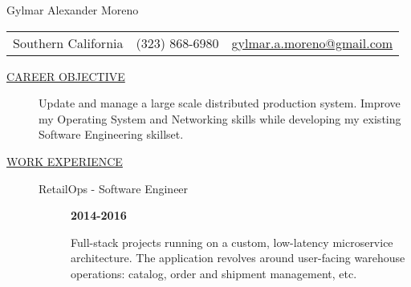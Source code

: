 \documentclass[12pt]{article}
\begin{document}
    \begin{center}
        {\LARGE Gylmar Alexander Moreno}
        \\
        \begin{tabular}{l|l|l}
            Southern California & (323) 868-6980 &
            \href{mailto:gylmar.a.moreno@gmail.com}{gylmar.a.moreno@gmail.com}
        \end{tabular}
    \end{center}

\begin{description}
    \item[\underline{CAREER OBJECTIVE}] \hfill
        \begin{flushleft}
            Update and manage a large scale distributed production system. Improve my Operating System and Networking skills while developing 
            my existing Software Engineering skillset.
        \end{flushleft}
    \item[\underline{WORK EXPERIENCE}] \hfill
        \begin{description}
            \item[RetailOps - Software Engineer] \hfill \textbf{2014-2016}
                \begin{flushleft}
                    Full-stack projects running on a custom, low-latency microservice architecture.
                    The application revolves around user-facing warehouse operations: catalog, order and shipment management, etc.
                \end{flushleft}


\end{description}
\end{description}
\end{document}
